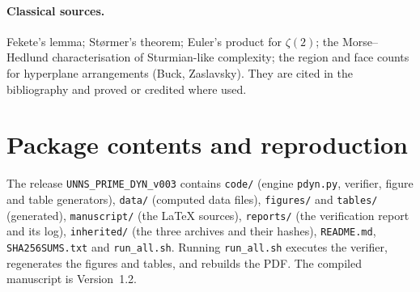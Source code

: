 \paragraph{Classical sources.} Fekete's lemma; Størmer's theorem; Euler's product for $\zeta(2)$; the Morse--Hedlund characterisation of Sturmian-like complexity; the region and face counts for hyperplane arrangements (Buck, Zaslavsky). They are cited in the bibliography and proved or credited where used.

\section{Package contents and reproduction}\label{app:pkg}
The release \texttt{UNNS\_PRIME\_DYN\_v003} contains \texttt{code/} (engine \texttt{pdyn.py}, verifier, figure and table generators), \texttt{data/} (computed data files), \texttt{figures/} and \texttt{tables/} (generated), \texttt{manuscript/} (the \LaTeX{} sources), \texttt{reports/} (the verification report and its log), \texttt{inherited/} (the three archives and their hashes), \texttt{README.md}, \texttt{SHA256SUMS.txt} and \texttt{run\_all.sh}. Running \texttt{run\_all.sh} executes the verifier, regenerates the figures and tables, and rebuilds the PDF. The compiled manuscript is Version~1.2.

